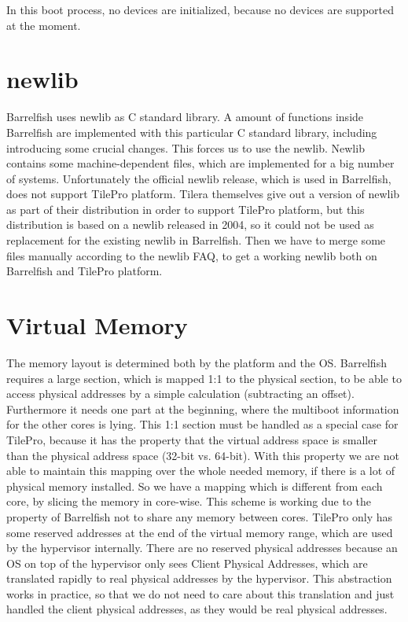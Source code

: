 \documentclass[a4paper,twoside]{report} %
\begin{document}
In this boot process, no devices are initialized, because no devices are supported at the moment.

\section{newlib}
Barrelfish uses newlib as C standard library. A amount of functions inside Barrelfish are implemented with this particular C standard library, including introducing some crucial changes. This forces us to use the newlib. Newlib contains some machine-dependent files, which are implemented for a big number of systems. Unfortunately the official newlib release, which is used in Barrelfish, does not support TilePro platform. Tilera themselves give out a version of newlib as part of their distribution in order to support TilePro platform, but this distribution is based on a newlib released in 2004, so it could not be used as replacement for the existing newlib in Barrelfish. Then we have to merge some files manually according to the newlib FAQ, to get a working newlib both on Barrelfish and TilePro platform.

\section{Virtual Memory}
The memory layout is determined both by the platform and the OS. Barrelfish requires a large section, which is mapped 1:1 to the physical section, to be able to access physical addresses by a simple calculation (subtracting an offset). Furthermore it needs one part at the beginning, where the multiboot information for the other cores is lying. This 1:1 section must be handled as a special case for TilePro, because it has the property that the virtual address space is smaller than the physical address space (32-bit vs. 64-bit). With this property we are not able to maintain this mapping over the whole needed memory, if there is a lot of physical memory installed. So we have a mapping which is different from each core, by slicing the memory in core-wise. This scheme is working due to the property of Barrelfish not to share any memory between cores. TilePro only has some reserved addresses at the end of the virtual memory range, which are used by the hypervisor internally. There are no reserved physical addresses because an OS on top of the hypervisor only sees Client Physical Addresses, which are translated rapidly to real physical addresses by the hypervisor. This abstraction works in practice, so that we do not need to care about this translation and just handled the client physical addresses, as they would be real physical addresses.
\end{document}
